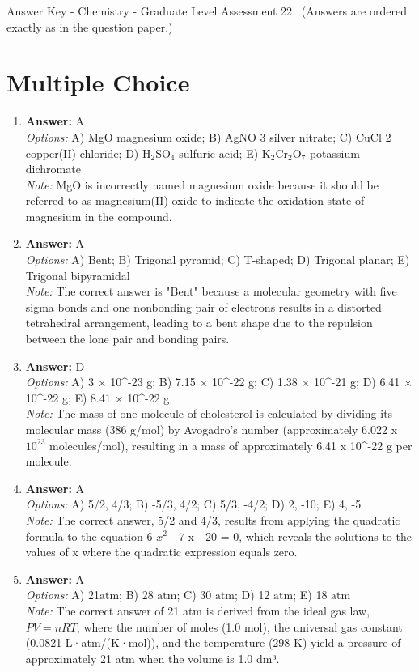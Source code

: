 \documentclass[12pt]{article}
\begin{document}
\begin{center}
Answer Key - Chemistry - Graduate Level Assessment 22 \
\small (Answers are ordered exactly as in the question paper.)
\end{center}

\section*{Multiple Choice}
\begin{enumerate}[label=\arabic*.]
\item \textbf{Answer:} A
\\ \textit{Options:} A) MgO magnesium oxide; B) AgNO 3 silver nitrate; C) CuCl 2 copper(II) chloride; D) H$_{2}$SO$_{4}$ sulfuric acid; E) K$_{2}$Cr$_{2}$O$_{7}$ potassium dichromate
\\ \textit{Note:} MgO is incorrectly named magnesium oxide because it should be referred to as magnesium(II) oxide to indicate the oxidation state of magnesium in the compound.
\item \textbf{Answer:} A
\\ \textit{Options:} A) Bent; B) Trigonal pyramid; C) T-shaped; D) Trigonal planar; E) Trigonal bipyramidal
\\ \textit{Note:} The correct answer is "Bent" because a molecular geometry with five sigma bonds and one nonbonding pair of electrons results in a distorted tetrahedral arrangement, leading to a bent shape due to the repulsion between the lone pair and bonding pairs.
\item \textbf{Answer:} D
\\ \textit{Options:} A) 3 \ensuremath{\times} 10^-23 g; B) 7.15 \ensuremath{\times} 10^-22 g; C) 1.38 \ensuremath{\times} 10^-21 g; D) 6.41 \ensuremath{\times} 10^-22 g; E) 8.41 \ensuremath{\times} 10^-22 g
\\ \textit{Note:} The mass of one molecule of cholesterol is calculated by dividing its molecular mass (386 g/mol) by Avogadro's number (approximately 6.022 x $10^23$ molecules/mol), resulting in a mass of approximately 6.41 x 10^-22 g per molecule.
\item \textbf{Answer:} A
\\ \textit{Options:} A) 5/2, 4/3; B) -5/3, 4/2; C) 5/3, -4/2; D) 2, -10; E) 4, -5
\\ \textit{Note:} The correct answer, 5/2 and 4/3, results from applying the quadratic formula to the equation 6 $x^2$ - 7 x - 20 = 0, which reveals the solutions to the values of x where the quadratic expression equals zero.
\item \textbf{Answer:} A
\\ \textit{Options:} A) 21$\mathrm{atm}$; B) 28 $\mathrm{atm}$; C) 30 $\mathrm{atm}$; D) 12 $\mathrm{atm}$; E) 18 $\mathrm{atm}$
\\ \textit{Note:} The correct answer of 21 atm is derived from the ideal gas law, \( PV = nRT \), where the number of moles (1.0 mol), the universal gas constant (0.0821 L·atm/(K·mol)), and the temperature (298 K) yield a pressure of approximately 21 atm when the volume is 1.0 dm³.
\end{enumerate}
\end{document}
